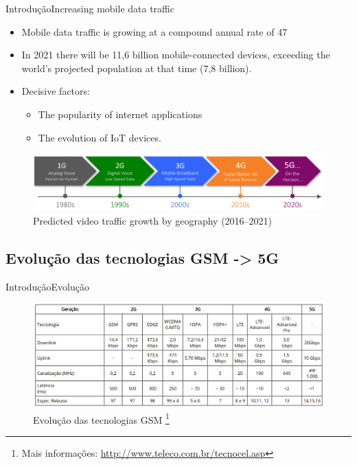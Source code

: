 \documentclass[10pt,aspectratio=169]{beamer} %
\begin{document}
\begin{frame}{Introdução}{Increasing mobile data traffic}
    \begin{itemize}
        \item Mobile data traffic is growing at a compound annual rate of 47%
        \item In 2021 there will be 11,6 billion mobile-connected devices, exceeding the world’s projected population at that time (7,8 billion).
        \item Decisive factors:
        \begin{itemize}
            \item The popularity of internet applications
            \item The evolution of IoT devices.
        \end{itemize}
    \end{itemize}
\begin{figure}[!htb]
    \centering
    \includegraphics[scale=0.7]{LRCgraphics/5G-Evolution-Chart.png}
    \caption{Predicted video traffic growth by geography (2016–2021)~\cite{ciena5g2018}}
\end{figure}
\end{frame}
\subsection{Evolução das tecnologias GSM -> 5G}
\begin{frame}{Introdução}{Evolução}

\begin{figure}[!htb]
    \centering
    \includegraphics[scale=0.37]{LRCgraphics/evolucao_teleco.png}
    \caption{Evolução das tecnologias GSM \footnote{Mais informações: \url{http://www.teleco.com.br/tecnocel.asp}}}
\end{figure}

\end{frame}
\end{document}
